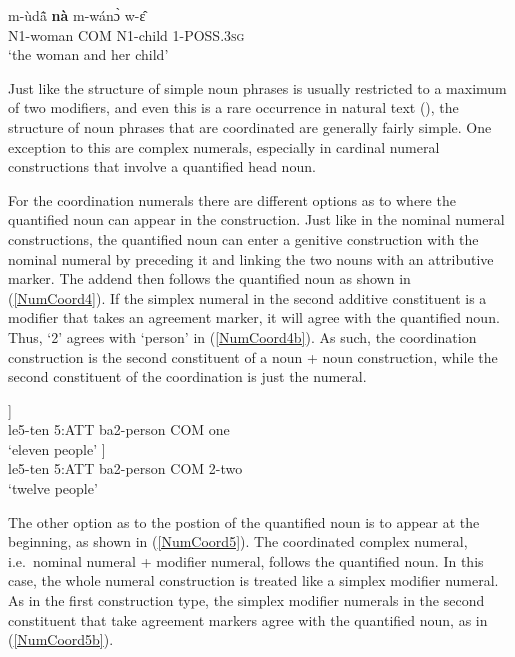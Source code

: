 \begin{exe}
\ex\label{NPCoord3} 
 \gll  m-ùdã̂  {\bfseries nà} m-wánɔ̀ w-ɛ̂ \\
            N1-woman COM N1-child 1-POSS.3\textsc{sg} \\
    \trans `the woman and her child'
\end{exe}


Just like the structure of simple noun phrases is usually restricted to a maximum of two modifiers, and even this is a rare occurrence in natural text (), the structure of noun phrases that are coordinated are generally fairly simple. One exception to this are complex numerals, especially in cardinal numeral constructions that involve a quantified head noun.

For the coordination numerals there are different options as to where the quantified noun can appear in the construction. Just like in the nominal numeral constructions, the quantified noun can enter a genitive construction with the nominal numeral by preceding it and linking the two nouns with an attributive marker. The addend then follows the quantified noun as shown in (\ref{NumCoord4}). If the simplex numeral in the second additive constituent is a modifier that takes an agreement marker, it will agree with the quantified noun. Thus, `2' agrees with `person' in (\ref{NumCoord4b}). As such, the coordination construction is the second constituent of a noun + noun construction, while the second constituent of the coordination is just the numeral.

\begin{exe}
\ex\label{NumCoord4}
\begin{xlist}
\ex \label{NumCoord4a}
  \gll     [lè-wúmɔ̀ lé [b-ùdì {\bfseries ná} vúdũ̃]] \\
                le5-ten 5:ATT ba2-person COM one \\
    \trans `eleven people'
\ex\label{NumCoord4b}
 \gll    [lè-wúmɔ̀ lé [b-ùdì {\bfseries ná} bá-báà]] \\
                le5-ten 5:ATT ba2-person COM 2-two \\
    \trans `twelve people'
\end {xlist}
\end {exe}

\noindent The other option as to the postion of the quantified noun is to appear at the beginning, as shown in (\ref{NumCoord5}). The coordinated complex numeral, i.e.~nominal numeral + modifier numeral, follows the quantified noun. In this case, the whole numeral construction is treated like a simplex modifier numeral. As in the first construction type, the simplex modifier numerals in the second constituent that take agreement markers agree with the quantified noun, as in (\ref{NumCoord5b}).

